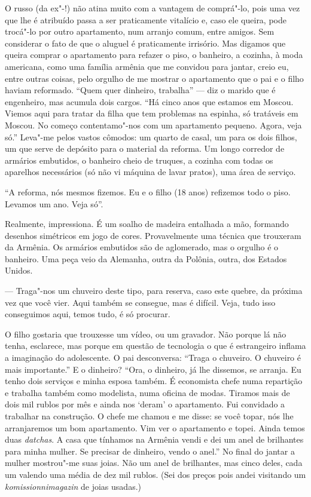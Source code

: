 O russo (da ex"-!) não atina muito com a vantagem de comprá"-lo, pois
uma vez que lhe é atribuído passa a ser praticamente vitalício e, caso
ele queira, pode trocá"-lo por outro apartamento, num arranjo comum,
entre amigos. Sem considerar o fato de que o aluguel é praticamente
irrisório. Mas digamos que queira comprar o apartamento para refazer o
piso, o banheiro, a cozinha, à moda americana, como uma família armênia
que me convidou para jantar, creio eu, entre outras coisas, pelo orgulho
de me mostrar o apartamento que o pai e o filho haviam reformado. ``Quem
quer dinheiro, trabalha'' --- diz o marido que é engenheiro, mas acumula
dois cargos. ``Há cinco anos que estamos em Moscou. Viemos aqui para
tratar da filha que tem problemas na espinha, só tratáveis em Moscou. No
começo contentamo"-nos com um apartamento pequeno. Agora, veja só.''
Leva"-me pelos vastos cômodos: um quarto de casal, um para os dois
filhos, um que serve de depósito para o material da reforma. Um longo
corredor de armários embutidos, o banheiro cheio de truques, a cozinha
com todas os aparelhos necessários (só não vi máquina de lavar pratos),
uma área de serviço.

``A reforma, nós mesmos fizemos. Eu e o filho (18 anos) refizemos todo o
piso. Levamos um ano. Veja só''.

Realmente, impressiona. É um soalho de madeira entalhada a
mão, formando desenhos simétricos em jogo de cores. Provavelmente uma
técnica que trouxeram da Armênia. Os armários embutidos são de
aglomerado, mas o orgulho é o banheiro. Uma peça veio da Alemanha, outra
da Polônia, outra, dos Estados Unidos.

--- Traga"-nos um chuveiro deste tipo, para reserva, caso este quebre, da
próxima vez que você vier. Aqui também se consegue, mas é difícil. Veja,
tudo isso conseguimos aqui, temos tudo, é só procurar.

O filho gostaria que trouxesse um vídeo, ou um gravador. Não porque lá
não tenha, esclarece, mas porque em questão de tecnologia o que é
estrangeiro inflama a imaginação do adolescente. O pai desconversa:
``Traga o chuveiro. O chuveiro é mais importante.'' E o dinheiro? ``Ora,
o dinheiro, já lhe dissemos, se arranja. Eu tenho dois serviços e minha
esposa também. É economista chefe numa repartição e trabalha também como
modelista, numa oficina de modas. Tiramos mais de dois mil rublos por
mês e ainda nos `deram' o apartamento. Fui convidado a trabalhar na
construção. O chefe me chamou e me disse: se você topar, nós lhe
arranjaremos um bom apartamento. Vim ver o apartamento e topei. Ainda
temos duas \emph{datchas}. A casa que tínhamos na Armênia vendi e dei um
anel de brilhantes para minha mulher. Se precisar de dinheiro, vendo o
anel.'' No final do jantar a mulher mostrou"-me suas joias. Não um anel
de brilhantes, mas cinco deles, cada um valendo uma média de dez mil
rublos. (Sei dos preços pois andei visitando um \emph{komissionnimagazin}
de joias usadas.)

